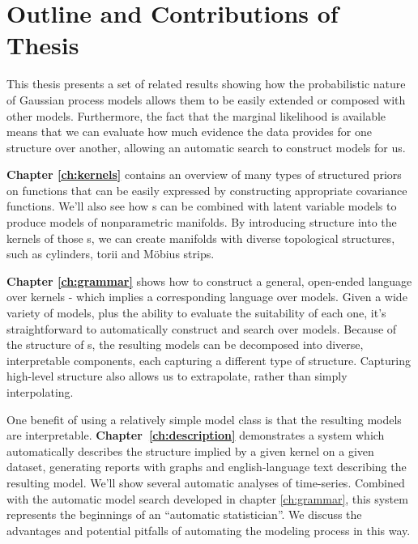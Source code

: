 \section{Outline and Contributions of Thesis}

This thesis presents a set of related results showing how the probabilistic nature of Gaussian process models allows them to be easily extended or composed with other models.
Furthermore, the fact that the marginal likelihood is available means that we can evaluate how much evidence the data provides for one structure over another, allowing an automatic search to construct models for us.

{\bf Chapter \ref{ch:kernels}} contains an overview of many types of structured priors on functions that can be easily expressed by constructing appropriate covariance functions.
We'll also see how \gp{}s can be combined with latent variable models to produce models of nonparametric manifolds.
By introducing structure into the kernels of those \gp{}s, we can create manifolds with diverse topological structures, such as cylinders, torii and M\"obius strips.

{\bf Chapter \ref{ch:grammar}} shows how to construct a general, open-ended language over kernels - which implies a corresponding language over models.
Given a wide variety of models, plus the ability to evaluate the suitability of each one, it's straightforward to automatically construct and search over models.
Because of the structure of \gp{}s, the resulting models can be decomposed into diverse, interpretable components, each capturing a different type of structure.
Capturing high-level structure also allows us to extrapolate, rather than simply interpolating.

One benefit of using a relatively simple model class is that the resulting models are interpretable.
{\bf Chapter~\ref{ch:description}} demonstrates a system which automatically describes the structure implied by a given kernel on a given dataset, generating reports with graphs and english-language text describing the resulting model.
We'll show several automatic analyses of time-series.
Combined with the automatic model search developed in chapter \ref{ch:grammar}, this system represents the beginnings of an ``automatic statistician''.
We discuss the advantages and potential pitfalls of automating the modeling process in this way.

